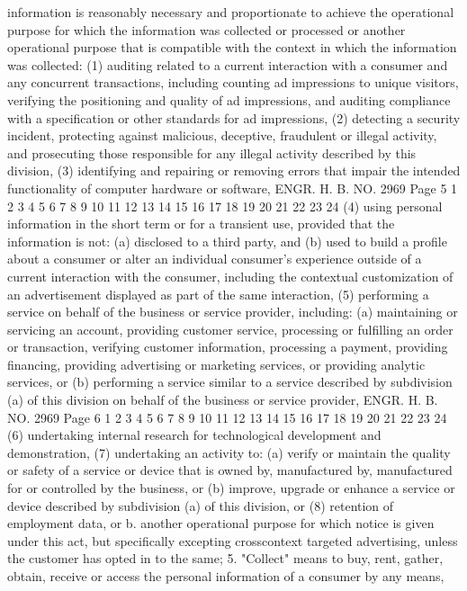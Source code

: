 information is reasonably necessary and proportionate
to achieve the operational purpose for which the
information was collected or processed or another
operational purpose that is compatible with the
context in which the information was collected:
(1) auditing related to a current interaction with a
consumer and any concurrent transactions,
including counting ad impressions to unique
visitors, verifying the positioning and quality
of ad impressions, and auditing compliance with a
specification or other standards for ad
impressions,
(2) detecting a security incident, protecting against
malicious, deceptive, fraudulent or illegal
activity, and prosecuting those responsible for
any illegal activity described by this division,
(3) identifying and repairing or removing errors that
impair the intended functionality of computer
hardware or software,
ENGR. H. B. NO. 2969 Page 5
1
2
3
4
5
6
7
8
9
10
11
12
13
14
15
16
17
18
19
20
21
22
23
24
(4) using personal information in the short term or
for a transient use, provided that the
information is not:
(a) disclosed to a third party, and
(b) used to build a profile about a consumer or
alter an individual consumer's experience
outside of a current interaction with the
consumer, including the contextual
customization of an advertisement displayed
as part of the same interaction,
(5) performing a service on behalf of the business or
service provider, including:
(a) maintaining or servicing an account,
providing customer service, processing or
fulfilling an order or transaction,
verifying customer information, processing a
payment, providing financing, providing
advertising or marketing services, or
providing analytic services, or
(b) performing a service similar to a service
described by subdivision (a) of this
division on behalf of the business or
service provider,
ENGR. H. B. NO. 2969 Page 6
1
2
3
4
5
6
7
8
9
10
11
12
13
14
15
16
17
18
19
20
21
22
23
24
(6) undertaking internal research for technological
development and demonstration,
(7) undertaking an activity to:
(a) verify or maintain the quality or safety of
a service or device that is owned by,
manufactured by, manufactured for or
controlled by the business, or
(b) improve, upgrade or enhance a service or
device described by subdivision (a) of this
division, or
(8) retention of employment data, or
b. another operational purpose for which notice is given
under this act, but specifically excepting crosscontext targeted advertising, unless the customer has
opted in to the same;
5. "Collect" means to buy, rent, gather, obtain, receive or
access the personal information of a consumer by any means,
